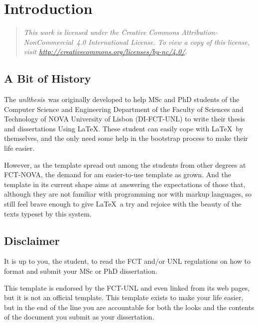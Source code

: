 \newcommand{\unlthesis}{\emph{unlthesis}}
\newcommand{\unlthesisclass}{\texttt{unlthesis.cls}}


\chapter{Introduction}
\label{cha:introduction}

\begin{quotation}
  \itshape
  This work is licensed under the Creative Commons Attribution-NonCommercial~4.0 International License.
  To view a copy of this license, visit \url{http://creativecommons.org/licenses/by-nc/4.0/}.
\end{quotation}

\section{A Bit of History} %
\label{sec:a_bit_of_history}

The \unlthesis\ was originally developed to help MSc and PhD students of the Computer Science and Engineering Department of the Faculty of Sciences and Technology of NOVA University of Lisbon (DI-FCT-UNL) to write their thesis and dissertations Using \LaTeX.
%
These student can easily cope with \LaTeX\ by themselves, and the only need some help in the bootstrap process to make their life easier.

However, as the template spread out among the students from other degrees at FCT-NOVA, the demand for am easier-to-use template as grown.
%
And the template in its current shape aims at answering the expectations of those that, although they are not familiar with programming nor with markup languages, so still feel brave enough to give \LaTeX\ a try and rejoice with the beauty of the texts typeset by this system.



\section{Disclaimer} %
\label{sec:disclaimer}

It is up to you, the student, to read the FCT and/or UNL regulations on how to format and submit your MSc or PhD dissertation.  

This template is endorsed by the FCT-UNL and even linked from its web pages, but it is not an official template.
%
This template exists to make your life easier, but in the end of the line you are accountable for both the looks and the contents of the document you submit as your dissertation.

